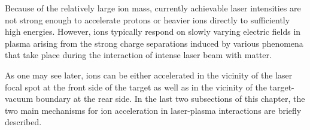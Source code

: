 Because of the relatively large ion mass, currently achievable laser intensities are not strong enough to accelerate protons or heavier ions directly to sufficiently high energies. However, ions typically respond on slowly varying electric fields in plasma arising from the strong charge separations induced by various phenomena that take place during the interaction of intense laser beam with matter.

As one may see later, ions can be either accelerated in the vicinity of the laser focal spot at the front side of the target as well as in the vicinity of the target-vacuum boundary at the rear side. In the last two subsections of this chapter, the two main mechanisms for ion acceleration in laser-plasma interactions are briefly described.
